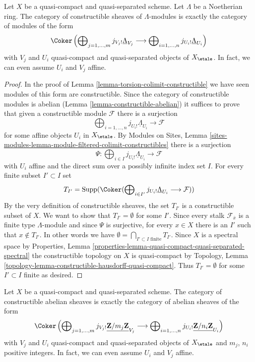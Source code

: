 \begin{lemma}
\label{lemma-category-constructible-modules}
Let $X$ be a quasi-compact and quasi-separated scheme. Let $\Lambda$
be a Noetherian ring. The category of constructible sheaves of
$\Lambda$-modules is exactly the category of modules of the form
$$
\Coker\left(
\bigoplus\nolimits_{j = 1, \ldots, m} j_{V_j!}\underline{\Lambda}_{V_j}
\longrightarrow
\bigoplus\nolimits_{i = 1, \ldots, n} j_{U_i!}\underline{\Lambda}_{U_i}
\right)
$$
with $V_j$ and $U_i$ quasi-compact and quasi-separated objects of
$X_\etale$. In fact, we can even assume $U_i$ and $V_j$ affine.
\end{lemma}

\begin{proof}
In the proof of Lemma \ref{lemma-torsion-colimit-constructible}
we have seen modules of this form are constructible. Since the
category of constructible modules is abelian
(Lemma \ref{lemma-constructible-abelian})
it suffices to prove that given a constructible module $\mathcal{F}$
there is a surjection
$$
\bigoplus\nolimits_{i = 1, \ldots, n} j_{U_i!}\underline{\Lambda}_{U_i}
\longrightarrow \mathcal{F}
$$
for some affine objects $U_i$ in $X_\etale$. By
Modules on Sites, Lemma
\ref{sites-modules-lemma-module-filtered-colimit-constructibles}
there is a surjection
$$
\Psi :
\bigoplus\nolimits_{i \in I} j_{U_i!}\underline{\Lambda}_{U_i}
\longrightarrow
\mathcal{F}
$$
with $U_i$ affine and the direct sum over a possibly infinite
index set $I$. For every finite subset $I' \subset I$ set
$$
T_{I'} = \text{Supp}(\Coker(
\bigoplus\nolimits_{i \in I'} j_{U_i!}\underline{\Lambda}_{U_i}
\longrightarrow \mathcal{F}))
$$
By the very definition of constructible sheaves, the set $T_{I'}$
is a constructible subset of $X$. We want to show that $T_{I'} = \emptyset$
for some $I'$. Since every stalk $\mathcal{F}_{\overline{x}}$ is
a finite type $\Lambda$-module and since $\Psi$ is surjective, for
every $x \in X$ there is an $I'$ such that $x \not \in T_{I'}$.
In other words we have
$\emptyset = \bigcap_{I' \subset I\text{ finite}} T_{I'}$. Since
$X$ is a spectral space by Properties, Lemma
\ref{properties-lemma-quasi-compact-quasi-separated-spectral}
the constructible topology on $X$ is quasi-compact by
Topology, Lemma \ref{topology-lemma-constructible-hausdorff-quasi-compact}.
Thus $T_{I'} = \emptyset$ for some $I' \subset I$ finite
as desired.
\end{proof}

\begin{lemma}
\label{lemma-category-constructible-abelian}
Let $X$ be a quasi-compact and quasi-separated scheme. The category of
constructible abelian sheaves is exactly the category of abelian
sheaves of the form
$$
\Coker\left(
\bigoplus\nolimits_{j = 1, \ldots, m}
j_{V_j!}\underline{\mathbf{Z}/m_j\mathbf{Z}}_{V_j}
\longrightarrow
\bigoplus\nolimits_{i = 1, \ldots, n}
j_{U_i!}\underline{\mathbf{Z}/n_i\mathbf{Z}}_{U_i}
\right)
$$
with $V_j$ and $U_i$ quasi-compact and quasi-separated objects of
$X_\etale$ and $m_j$, $n_i$ positive integers.
In fact, we can even assume $U_i$ and $V_j$ affine.
\end{lemma}


